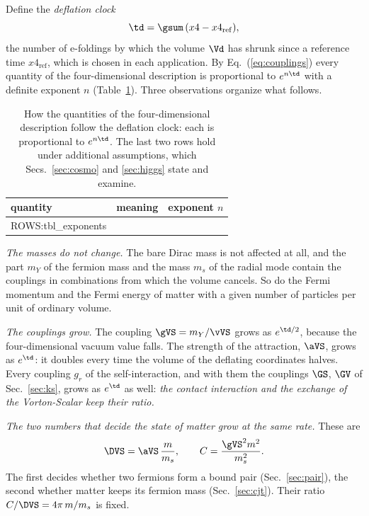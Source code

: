 Define the \emph{deflation clock}
\begin{equation}
\td=\gsum\,(x4-x4_{\mathrm{ref}}),
\label{eq:clock}
\end{equation}
the number of e-foldings by which the volume $\Vd$ has shrunk since a reference time
$x4_{\mathrm{ref}}$, which is chosen in each application. By Eq.~(\ref{eq:couplings}) every quantity
of the four-dimensional description is proportional to $e^{n\td}$ with a definite exponent $n$
(Table~\ref{tab:exponents}). Three observations organize what follows.

\begin{table}
\caption{\label{tab:exponents}How the quantities of the four-dimensional description follow the
deflation clock: each is proportional to $e^{n\td}$. The last two rows hold under additional
assumptions, which Secs.~\ref{sec:cosmo} and \ref{sec:higgs} state and examine.}
\begin{ruledtabular}
\begin{tabular}{p{}p{}c}
quantity & meaning & exponent $n$ \\
\hline
{{ROWS:tbl_exponents}}
\end{tabular}
\end{ruledtabular}
\end{table}

\emph{The masses do not change.} The bare Dirac mass is not affected at all, and the part $m_Y$ of
the fermion mass and the mass $m_s$ of the radial mode contain the couplings in combinations from
which the volume cancels. So do the Fermi momentum and the Fermi
energy of matter with a given number of particles per unit of ordinary volume.

\emph{The couplings grow.} The coupling $\gVS=m_Y/\vVS$ grows as $e^{\td/2}$, because the
four-dimensional vacuum value falls. The strength of the attraction, $\aVS$, grows as $e^{\td}$: it
doubles every time the volume of the deflating coordinates halves. Every coupling $g_r$ of the
self-interaction, and with them the couplings $\GS$, $\GV$ of Sec.~\ref{sec:ks}, grows as $e^{\td}$
as well: \emph{the contact interaction and the exchange of the Vorton-Scalar keep their ratio.}

\emph{The two numbers that decide the state of matter grow at the same rate.} These are
\begin{equation}
\DVS=\aVS\,\frac{m}{m_s},\qquad C=\frac{\gVS^{2}m^{2}}{m_s^{2}} .
\label{eq:DC}
\end{equation}
The first decides whether two fermions form a bound pair (Sec.~\ref{sec:pair}), the second whether
matter keeps its fermion mass (Sec.~\ref{sec:cjt}). Their ratio $C/\DVS=4\pi\,m/m_s$ is fixed.

